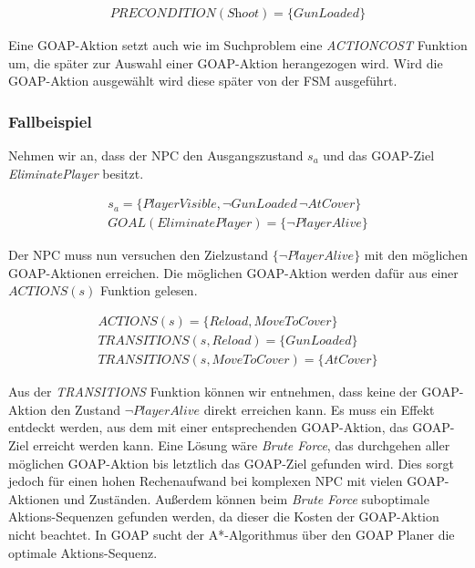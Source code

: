 \begin{align}
	\textit{PRECONDITION}(\textit{Shoot}) = \{\textit{GunLoaded}\}
\end{align}

Eine GOAP-Aktion setzt auch wie im Suchproblem eine \textit{ACTIONCOST} Funktion um, die sp\"{a}ter zur Auswahl einer GOAP-Aktion herangezogen wird. Wird die GOAP-Aktion ausgew\"{a}hlt wird diese sp\"{a}ter von der FSM ausgef\"{u}hrt.


\subsubsection{Fallbeispiel}
\label{chap:goap action beispiel}

Nehmen wir an, dass der NPC den Ausgangszustand $s_a$ und das GOAP-Ziel \textit{EliminatePlayer} besitzt.

\begin{align}
	s_a = \{\textit{PlayerVisible}, \lnot \textit{GunLoaded}\, \lnot \textit{AtCover}\} \\
	\textit{GOAL}(\textit{EliminatePlayer}) = \{\lnot \textit{PlayerAlive}\}
\end{align}


Der NPC muss nun versuchen den Zielzustand $\{\lnot \textit{PlayerAlive}\}$ mit den m\"{o}glichen GOAP-Aktionen erreichen. Die m\"{o}glichen GOAP-Aktion werden daf\"{u}r aus einer $\textit{ACTIONS}(s)$ Funktion gelesen.

\begin{align}
	\textit{ACTIONS}(s) = \{\textit{Reload}, \textit{MoveToCover}\} \\
	\textit{TRANSITIONS}(s,\textit{Reload}) = \{\textit{GunLoaded}\} \\
	\textit{TRANSITIONS}(s,\textit{MoveToCover}) = \{\textit{AtCover}\}
\end{align}


Aus der \textit{TRANSITIONS} Funktion k\"{o}nnen wir entnehmen, dass keine der GOAP-Aktion den Zustand $\lnot \textit{PlayerAlive}$ direkt erreichen kann. Es muss ein Effekt entdeckt werden, aus dem mit einer entsprechenden GOAP-Aktion, das GOAP-Ziel erreicht werden kann. Eine L\"{o}sung w\"{a}re \textit{Brute Force}, das durchgehen aller m\"{o}glichen GOAP-Aktion bis letztlich das GOAP-Ziel gefunden wird. Dies sorgt jedoch f\"{u}r einen hohen Rechenaufwand bei komplexen NPC mit vielen GOAP-Aktionen und Zust\"{a}nden. Au\ss{}erdem k\"{o}nnen beim \textit{Brute Force} suboptimale Aktions-Sequenzen gefunden werden, da dieser die Kosten der GOAP-Aktion nicht beachtet. In GOAP sucht der A*-Algorithmus \"{u}ber den GOAP Planer die optimale Aktions-Sequenz.


